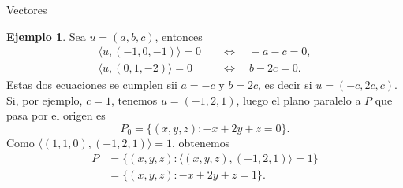 \documentclass[a4paper,12pt,twoside,spanish]{amsbook}
\theoremstyle{definition}
\newtheorem{ejemplo}{Ejemplo}[section]
\theoremstyle{remark}
\newcommand{\la}{\langle}
\newcommand{\ra}{\rangle}
\begin{document}
\begin{chapter}{Vectores}
\begin{ejemplo}
		 Sea $u= (a,b,c)$,  entonces 
		\begin{align*}
			\la u,(-1,0,-1) \ra = 0 \quad &\Leftrightarrow \quad -a -c=0, \\
			\la u,(0,1,-2) \ra = 0 \quad &\Leftrightarrow \quad b -2c=0.
		\end{align*} 
		Estas dos ecuaciones se cumplen sii $a = -c$ y $b=2c$, es decir si $u=(-c,2c,c)$. Si, por ejemplo, $c=1$, tenemos $u=(-1,2,1)$, luego el plano paralelo a $P$  que pasa por el origen es
		\begin{equation*}
		P_0 = \{(x,y,z): -x+2y+z =0\}. 
		\end{equation*}
		Como $\la (1,1,0),(-1,2,1) \ra = 1 $, obtenemos
		\begin{align*}
		P &= \{(x,y,z): \la (x,y,z),(-1,2,1) \ra =1\} \\
		&= \{(x,y,z): -x+2y+z =1\}.
		\end{align*}
		    
		
	\end{ejemplo}

	\end{chapter}
	
\end{document}
